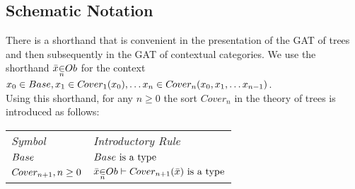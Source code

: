 \subsection {Schematic Notation}
\newcommand{\ft}[1]{
#1 \kern-6pt \raisebox{1.1ex}{$\leftrightline$} \kern-3pt \raisebox{.1ex}{$\downarrow$}}
\newcommand{\bbin}[1]{
\raisebox{-0.5em}{$\stackrel{\displaystyle{\in}} {\scriptstyle{#1}}$}
}
\newcommand{\ofTn}[3]{
\raisebox{0.25pt}{$\bar{#1}$} \bbin{#2} #3}

\newcommand{\genericOb}{Ob} %

There is a  shorthand that is convenient in the presentation  of the GAT of trees  and then subsequently in the GAT of contextual categories. We use the shorthand
$\ofTn{x}{n}{\genericOb}$ for the context $x_0 \in Base,x_1 \in C\kern-1pt over_{1}(x_0), \hdots x_n \in C\kern-1pt over_{n}(x_0,x_1,\hdots x_{n-1}) $. \\

\noindent Using this shorthand, for any $n \geq 0$ the sort $Cover_{n}$  in the theory of trees is introduced as follows: \\

\vspace{0.03cm} 
\begin{tabular}{>{\itshape}l l}
Symbol & \itshape{Introductory Rule} \\
$Base  $     & $Base\mbox{ is a type}$\\
$C\kern-1pt over_{n+1}, n \geq 0 $ & $\ofTn{x}{n}{\genericOb}    \tstyle \isT{\Si{n+1}(\bar{x})} $\\
\end{tabular} \\
\vspace{.1cm}  \\

